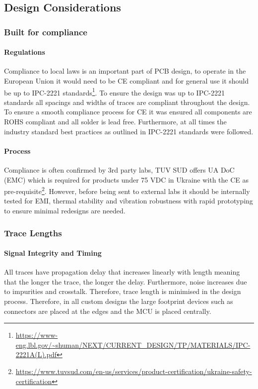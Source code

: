 \subsection{Design Considerations}\label{sub_section:tgt_design_considerations}

\subsubsection{Built for compliance}
\paragraph{Regulations}
Compliance to local laws is an important part of \gls{PCB} design, to operate in the European Union it would need to be CE compliant and for general use it should be up to IPC-2221 standards\footnote{\url{https://www-eng.lbl.gov/~shuman/NEXT/CURRENT_DESIGN/TP/MATERIALS/IPC-2221A(L).pdf}}. To ensure the design was up to IPC-2221 standards all spacings and widths of traces are compliant throughout the design. To ensure a smooth compliance process for CE it was ensured all components are \gls{ROHS} compliant and all solder is lead free. Furthermore, at all times the industry standard best practices as outlined in IPC-2221 standards were followed.
\paragraph{Process}
Compliance is often confirmed by 3rd party labs, TUV SUD offers UA DoC (EMC) which is required for products under 75 VDC in Ukraine with the CE as pre-requisite\footnote{\url{https://www.tuvsud.com/en-us/services/product-certification/ukraine-safety-certification}}. However, before being sent to external labs it should be internally tested for \gls{EMI}, thermal stability and vibration robustness with rapid prototyping to ensure minimal redesigns are needed.

\subsubsection{Trace Lengths}\label{sub_sub_section:tgt_trace_lengths}
\paragraph{Signal Integrity and Timing}
All traces have propagation delay that increases linearly with length meaning that the longer the trace, the longer the delay. Furthermore, noise increases due to impurities and crosstalk. Therefore, trace length is minimised in the design process. Therefore, in all custom designs the large footprint devices such as connectors are placed at the edges and the \gls{MCU} is placed centrally.
